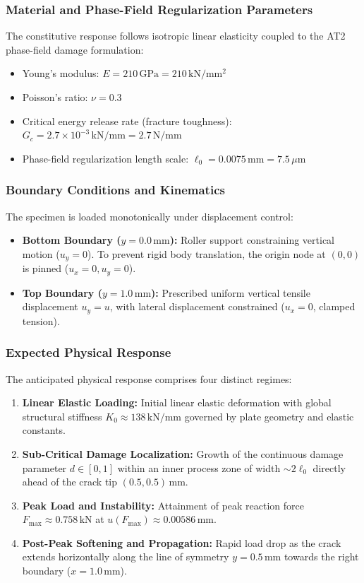 \subsubsection{Material and Phase-Field Regularization Parameters}
The constitutive response follows isotropic linear elasticity coupled to the AT2 phase-field damage formulation:
\begin{itemize}[leftmargin=4mm,itemsep=1pt,topsep=1pt]
  \item Young's modulus: $E = 210\,\mathrm{GPa} = 210\,\mathrm{kN/mm^2}$
  \item Poisson's ratio: $\nu = 0.3$
  \item Critical energy release rate (fracture toughness): $G_c = 2.7 \times 10^{-3}\,\mathrm{kN/mm} = 2.7\,\mathrm{N/mm}$
  \item Phase-field regularization length scale: $\ell_0 = 0.0075\,\mathrm{mm} = 7.5\,\mu\mathrm{m}$
\end{itemize}

\subsubsection{Boundary Conditions and Kinematics}
The specimen is loaded monotonically under displacement control:
\begin{itemize}[leftmargin=4mm,itemsep=1pt,topsep=1pt]
  \item \textbf{Bottom Boundary ($y = 0.0\,\mathrm{mm}$):} Roller support constraining vertical motion ($u_y = 0$). To prevent rigid body translation, the origin node at $(0, 0)$ is pinned ($u_x = 0, u_y = 0$).
  \item \textbf{Top Boundary ($y = 1.0\,\mathrm{mm}$):} Prescribed uniform vertical tensile displacement $u_y = u$, with lateral displacement constrained ($u_x = 0$, clamped tension).
\end{itemize}

\subsubsection{Expected Physical Response}
The anticipated physical response comprises four distinct regimes:
\begin{enumerate}[leftmargin=4mm,itemsep=1pt,topsep=1pt]
  \item \textbf{Linear Elastic Loading:} Initial linear elastic deformation with global structural stiffness $K_0 \approx 138\,\mathrm{kN/mm}$ governed by plate geometry and elastic constants.
  \item \textbf{Sub-Critical Damage Localization:} Growth of the continuous damage parameter $d \in [0, 1]$ within an inner process zone of width $\sim 2\ell_0$ directly ahead of the crack tip $(0.5, 0.5)\,\mathrm{mm}$.
  \item \textbf{Peak Load and Instability:} Attainment of peak reaction force $F_{\max} \approx 0.758\,\mathrm{kN}$ at $u(F_{\max}) \approx 0.00586\,\mathrm{mm}$.
  \item \textbf{Post-Peak Softening and Propagation:} Rapid load drop as the crack extends horizontally along the line of symmetry $y = 0.5\,\mathrm{mm}$ towards the right boundary ($x = 1.0\,\mathrm{mm}$).
\end{enumerate}

